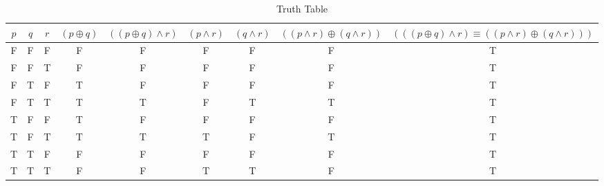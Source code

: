 \begin{table}[ht]
\caption{Truth Table}
\centering
\begin{tabular}{|c|c|c||c|c|c|c|c|c|}
\hline
$ p $ & $ q $ & $ r $ & $ (p \oplus q) $ & $ ((p \oplus q) \wedge r) $ & $ (p \wedge r) $ & $ (q \wedge r) $ & $ ((p \wedge r) \oplus (q \wedge r)) $ & $ (((p \oplus q) \wedge r) \equiv ((p \wedge r) \oplus (q \wedge r))) $ \\
\hline
F & F & F & F & F & F & F & F & T \\
F & F & T & F & F & F & F & F & T \\
F & T & F & T & F & F & F & F & T \\
F & T & T & T & T & F & T & T & T \\
T & F & F & T & F & F & F & F & T \\
T & F & T & T & T & T & F & T & T \\
T & T & F & F & F & F & F & F & T \\
T & T & T & F & F & T & T & F & T \\
\hline
\end{tabular}
\label{table:tt1}
\end{table}
